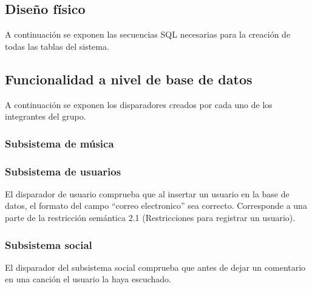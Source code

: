 \subsection{Diseño físico}

A continuación se exponen las secuencias SQL necesarias para la creación de todas las tablas del sistema.

 

\subsection{Funcionalidad a nivel de base de datos}

A continuación se exponen los disparadores creados por cada uno de los integrantes del grupo.

\subsubsection{Subsistema de música}

 


\subsubsection{Subsistema de usuarios}

El disparador de usuario comprueba que al insertar un usuario en la base de datos, el formato del campo ``correo electronico'' sea correcto. Corresponde a una parte de la restricción semántica 2.1 (Restricciones para registrar un usuario).
 

\subsubsection{Subsistema social}
El disparador del subsistema social comprueba que antes de dejar un comentario en una canción el usuario la haya escuchado.
 
